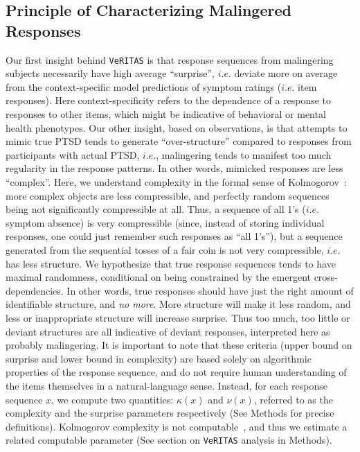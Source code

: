 \documentclass[onecolumn,10pt]{IEEEtran}
\def\Methods{Online Methods}
\def\Methods{Methods\xspace}
\def\vrts{\texttt{VeRITAS}\xspace}
\begin{document}
\subsection*{Principle of Characterizing Malingered Responses}
Our first insight behind \vrts  is that  response sequences from malingering subjects necessarily  have high average ``surprise'', $i.e. $ deviate more on average from the context-specific model predictions of symptom ratings ($i.e. $ item responses). Here context-specificity refers to the dependence of a response to  responses to other items, which might be indicative of behavioral  or mental health phenotypes. Our other insight, based on observations,  is that attempts  to mimic true PTSD   tends to generate ``over-structure'' compared to responses from participants with actual PTSD, $i.e.$, malingering tends to manifest  too much regularity in the response patterns. In other words, mimicked responses are less ``complex''. Here, we understand complexity in the formal sense of Kolmogorov~\cite{li2008introduction}: more complex objects are less compressible, and  perfectly random sequences being not significantly compressible at all. Thus, a sequence of all 1's ($i.e. $ symptom absence) is very compressible (since, instead of storing individual responses, one could just remember such responses as ``all 1's''), but a sequence generated from the sequential tosses of a fair coin is not very compressible, $i.e.$ has less structure.  We hypothesize that true response sequences  tends to have maximal randomness, conditional on being constrained by the emergent cross-dependencies. In other words, true responses  should have just the right amount of identifiable structure, and \textit{no more}.  More structure will make it less random, and less or inappropriate structure will increase surprise. Thus too much, too little or deviant structures are all indicative of deviant responses, interpreted here as probably malingering.  It is important to note that  these criteria (upper bound on surprise and lower bound in complexity) are based solely on algorithmic properties of the response sequence, and do not require human  understanding of the items themselves in a natural-language sense. Instead, for each response sequence $x$, we compute two quantities: $\kappa(x)$ and  $\nu(x)$, referred to as the complexity  and the surprise parameters respectively (See \Methods for precise definitions). Kolmogorov complexity is not computable~\cite{li2008introduction}, and thus we estimate a related computable parameter (See section on \vrts analysis in \Methods).
\end{document}
